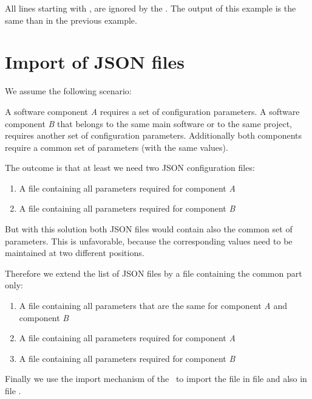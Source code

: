 All lines starting with \pcode{//}, are ignored by the \pkg. The output of this example is the same than in the previous example.


\newpage

\section{Import of JSON files}

We assume the following scenario:

A software component \textit{A} requires a set of configuration parameters. A software component \textit{B} that belongs to the same
main software or to the same project, requires another set of configuration parameters. Additionally both components
require a common set of parameters (with the same values).

The outcome is that at least we need two JSON configuration files:

\begin{enumerate}
   \item A file  containing all parameters required for component \textit{A}
   \item A file  containing all parameters required for component \textit{B}
\end{enumerate}

But with this solution both JSON files would contain also the common set of parameters. This is unfavorable, because
the corresponding values need to be maintained at two different positions.

Therefore we extend the list of JSON files by a file containing the common part only:

\begin{enumerate}
   \item A file  containing all parameters that are the same for component \textit{A} and component \textit{B}
   \item A file  containing all parameters required for component \textit{A}
   \item A file  containing all parameters required for component \textit{B}
\end{enumerate}

Finally we use the import mechanism of the \pkg\ to import the file  in file  and also in
file .


